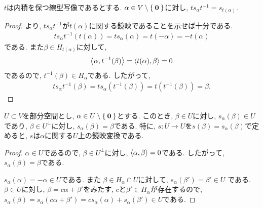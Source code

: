 \begin{prop}
  \label{prop:conjbyortho}
  $t$は内積を保つ線型写像であるとする.
  $\alpha\in V\setminus\Set{\boldsymbol{0}}$に対し,
  $ts_\alpha t^{-1}=s_{t(\alpha)}$.
\end{prop}
\begin{proof}
より,
  $ts_\alpha t^{-1}$が$t(\alpha)$に関する鏡映であることを示せば十分である.
\begin{align*}
  ts_\alpha t^{-1}(t(\alpha))=ts_\alpha(\alpha)=t(-\alpha)=-t(\alpha)
\end{align*}
である. また$\beta\in H_{t(\alpha)}$に対して,
\begin{align*}
\Braket{\alpha,t^{-1}(\beta)}
=\Braket{t(\alpha),\beta}
=0
\end{align*}
であるので, $t^{-1}(\beta)\in H_\alpha$である.
したがって,
\begin{align*}
  ts_\alpha t^{-1}(\beta)=ts_\alpha(t^{-1}(\beta))=t(t^{-1}(\beta))=\beta.
\end{align*}
\end{proof}

\begin{prop}
  \label{lem:subsp:refl}
  $U\subset V$を部分空間とし,
  $\alpha \in U \setminus \Set{\boldsymbol{0}}$とする.
  このとき,
  $\beta\in U$に対し, $s_\alpha(\beta)\in U$であり,
  $\beta\in U^\perp$に対し, $s_\alpha(\beta)=\beta$である.
  特に,
  $s\colon U \to U$を$s(\beta)=s_\alpha(\beta)$で定めると,
  $s$は$\alpha$に関する$U$上の鏡映変換である.
\end{prop}
\begin{proof}
  $\alpha\in U$であるので,
  $\beta\in U^\perp$に対し,
  $\Braket{\alpha,\beta}=0$である.
  したがって, $s_\alpha(\beta)=\beta$である.

  $s_\alpha(\alpha)=-\alpha\in U$である.
  また
  $\beta \in H_\alpha\cap U$に対して,
  $s_{\alpha}(\beta')=\beta'\in U$
  である.
  $\beta\in U$に対し,
  $\beta=c\alpha + \beta'$をみたす,
  $c$と$\beta'\in H_\alpha$が存在するので,
  $s_{\alpha}(\beta)=s_{\alpha}(c\alpha+\beta')=cs_{\alpha}(\alpha)+s_{\alpha}(\beta')\in U$である.
\end{proof}


